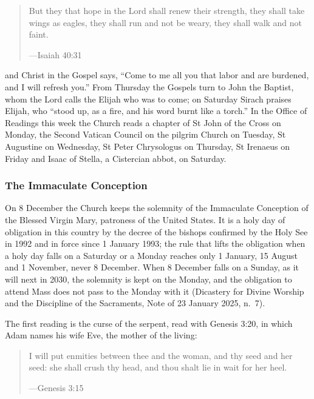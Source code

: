 \begin{quote}
But they that hope in the Lord shall renew their strength, they shall take wings
as eagles, they shall run and not be weary, they shall walk and not faint.\par
{\smallskip\noindent\small ---Isaiah 40:31\par}
\end{quote}

\noindent and Christ in the Gospel says, ``Come to me all you that labor and are
burdened, and I will refresh you.'' From Thursday the Gospels turn to John the
Baptist, whom the Lord calls the Elijah who was to come; on Saturday Sirach
praises Elijah, who ``stood up, as a fire, and his word burnt like a torch.''
In the Office of Readings this week the Church reads a chapter of St John of
the Cross on Monday, the
Second Vatican Council on the pilgrim Church on Tuesday, St Augustine on
Wednesday, St Peter Chrysologus on Thursday, St Irenaeus on Friday and Isaac of
Stella, a Cistercian abbot, on Saturday.

\subsubsection*{The Immaculate Conception}

On 8 December the Church keeps the solemnity of the Immaculate Conception of
the Blessed Virgin Mary, patroness of the United States. It is a holy day of
obligation in this country by the decree of the bishops confirmed by the Holy
See in 1992 and in force since 1 January 1993; the rule that lifts the
obligation when a holy day falls on a Saturday or a Monday reaches only 1
January, 15 August and 1 November, never 8 December. When 8 December falls on a
Sunday, as it will next in 2030, the solemnity is kept on the Monday, and the
obligation to attend Mass does not pass to the Monday with it (Dicastery for
Divine Worship and the Discipline of the Sacraments, Note of 23 January 2025,
n.~7).

The first reading is the curse of the serpent, read with Genesis 3:20, in which
Adam names his wife Eve, the mother of the living:

\begin{quote}
I will put enmities between thee and the woman, and thy seed and her seed: she
shall crush thy head, and thou shalt lie in wait for her heel.\par
{\smallskip\noindent\small ---Genesis 3:15\par}
\end{quote}

